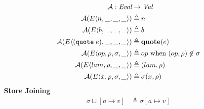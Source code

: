 \documentclass[12pt,draft]{article}
\newcommand{\quotesyn}[1]{(\texttt{quote}\;#1)}
\newcommand{\E}[4]{E\langle #1 , #2 , #3 , #4 \rangle}
\begin{document}
\begin{multicols*}{2}
\begin{align*}
    \mathcal{A} : \textit{Eval} &\rightarrow \cVal \\
    \mathcal{A}(\E{n}{\_}{\_}{\_}) &\triangleq n \\
    \mathcal{A}(\E{b}{\_}{\_}{\_}) &\triangleq b \\
    \mathcal{A}(\E{\quotesyn{e}}{\_}{\_}{\_}) &\triangleq \textbf{quote}(e) \\
    \mathcal{A}(\E{op}{\cenv}{\cstore}{\_})
                                &\triangleq op \text{ when }
                                  (op , \cenv) \not\in \cstore \\
    \mathcal{A}(\E{lam}{\cenv}{\_}{\_}) &\triangleq (lam , \cenv) \\
    \mathcal{A}(\E{x}{\cenv}{\cstore}{\_}) &\triangleq \cstore(x , \cenv)
  \end{align*}
  \textbf{Store Joining} \\
  \vspace{-3mm}
  \begin{align*}
    \sigma \sqcup [a \mapsto v] &\triangleq \sigma[a \mapsto v]
  \end{align*}
\end{multicols*}


\newpage
\end{document}
